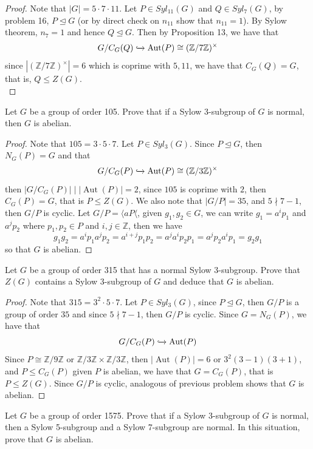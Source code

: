 \documentclass{article}
\newcommand{\Z}{\mathbb{Z}}
\newenvironment{problem}[2][Problem]{\begin{trivlist}
\item[\hskip \labelsep {\bfseries #1}\hskip \labelsep {\bfseries #2.}]}{\end{trivlist}}
\DeclareMathOperator{\Aut}{Aut}
\begin{document}
\begin{proof}
    Note that $|G|=5\cdot 7 \cdot 11$. Let $P\in Syl_{11}(G)$ and $Q\in Syl_{7}(G)$, by problem 16, $P\trianglelefteq G$ (or by direct check on $n_{11}$ show that $n_{11}=1$). By Sylow theorem, $n_{7}=1$ and hence $Q\trianglelefteq G$. Then by Proposition 13, we have that 
    \[
        G/C_G(Q) \xhookrightarrow{} \Aut(P) \cong (\Z/7\Z)^{\times}
    \]
    since $|(\Z/7\Z)^{\times}|=6$ which is coprime with $5, 11$, we have that $C_G(Q)=G$, that is, $Q\leq Z(G)$.\\
\end{proof}
\begin{problem}{26}
        Let $G$ be a group of order 105. Prove that if a Sylow 3-subgroup of $G$ is normal, then $G$ is abelian.
\end{problem}
\begin{proof}
    Note that $105 = 3 \cdot 5 \cdot 7$. Let $P\in Syl_3(G)$. Since $P\trianglelefteq G$, then $N_G(P)=G$ and that 
    \[
        G/C_G(P)\xhookrightarrow{} \Aut(P)\cong (\Z/3\Z)^{\times}
    \]
    then $|G/C_G(P)|\mid |\Aut(P)|=2$, since $105$ is coprime with $2$, then $C_G(P)=G$, that is $P\leq Z(G)$. We also note that $|G/P|=35$, and $5\nmid 7-1$, then $G/P$ is cyclic. Let $G/P=\langle a P \langle$, given $g_1, g_2\in G$, we can write $g_1 = a^ip_1$ and $a^jp_2$ where $p_1, p_2\in P$ and $i, j\in \Z$, then we have
    \[
    g_1g_2 =a^ip_1a^jp_2=a^{i+j}p_1p_2=a^{j}a^ip_2p_1=a^jp_2a^ip_1=g_2g_1
    \]
    so that $G$ is abelian.
\end{proof}
\begin{problem}{27}
        Let $G$ be a group of order 315 that has a normal Sylow 3-subgroup. Prove that $Z(G)$ contains a Sylow 3-subgroup of $G$ and deduce that $G$ is abelian.
\end{problem}
\begin{proof}
    Note that $315 = 3^2 \cdot 5 \cdot 7$. Let $P\in Syl_3(G)$, since $P\trianglelefteq G$, then $G/P$ is a group of order $35$ and since $5 \nmid 7-1$, then $G/P$ is cyclic. Since $G=N_G(P)$, we have that 
    \[
        G/C_G(P)\xhookrightarrow{} \Aut(P)
    \]
    Since $P\cong \Z/9\Z$ or $\Z/3\Z\times \Z/3\Z$, then $|\Aut(P)|=6$ or $3^2(3-1)(3+1)$, and $P\leq C_G(P)$ given $P$ is abelian, we have that $G=C_G(P)$, that is $P\leq Z(G)$. Since $G/P$ is cyclic, analogous of previous problem shows that $G$ is abelian.
\end{proof}
\begin{problem}{28}
         Let $G$ be a group of order 1575. Prove that if a Sylow 3-subgroup of $G$ is normal, then a Sylow 5-subgroup and a Sylow 7-subgroup are normal. In this situation, prove that $G$ is abelian.
\end{problem}
\end{document}
